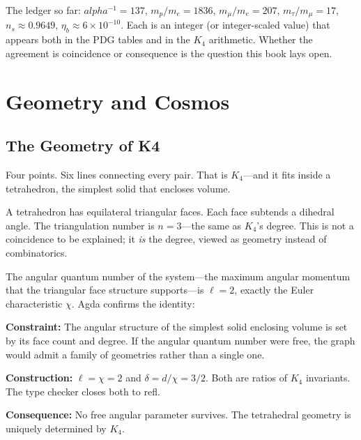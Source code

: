 \documentclass[11pt,a4paper]{book}
\def\alpha{alpha}%
\def\texttt#1{#1}%
\def\texorpdfstring#1#2{#2}%
\begin{document}
The ledger so far: $\alpha^{-1} = 137$, $m_p/m_e = 1836$, $m_\mu/m_e = 207$, $m_\tau/m_\mu = 17$, $n_s \approx 0.9649$, $\eta_b \approx 6 \times 10^{-10}$. Each is an integer (or integer-scaled value) that appears both in the PDG tables and in the $K_4$ arithmetic. Whether the agreement is coincidence or consequence is the question this book lays open.

\part{Geometry and Cosmos}

\chapter{The Geometry of K\texorpdfstring{$_4$}{4}}
\label{ch:geometry}

Four points. Six lines connecting every pair. That is $K_4$---and it fits inside a tetrahedron, the simplest solid that encloses volume.

A tetrahedron has equilateral triangular faces. Each face subtends a dihedral angle. The triangulation number is $n = 3$---the same as $K_4$'s degree. This is not a coincidence to be explained; it \emph{is} the degree, viewed as geometry instead of combinatorics.

The angular quantum number of the system---the maximum angular momentum that the triangular face structure supports---is $\ell = 2$, exactly the Euler characteristic $\chi$. Agda confirms the identity:

\textbf{Constraint:} The angular structure of the simplest solid enclosing volume is set by its face count and degree. If the angular quantum number were free, the graph would admit a family of geometries rather than a single one.

\textbf{Construction:} $\ell = \chi = 2$ and $\delta = d/\chi = 3/2$. Both are ratios of $K_4$ invariants. The type checker closes both to \texttt{refl}.

\textbf{Consequence:} No free angular parameter survives. The tetrahedral geometry is uniquely determined by $K_4$.
\end{document}
